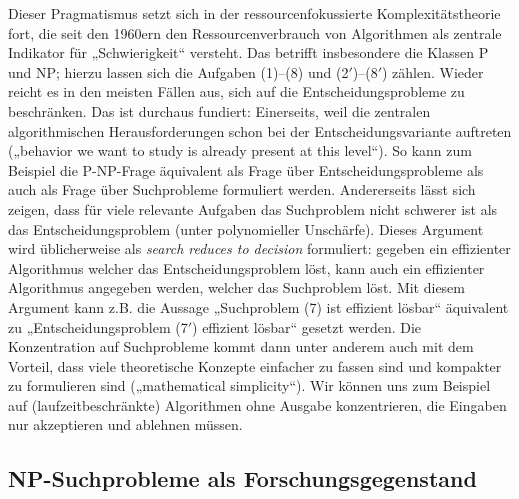 Dieser Pragmatismus setzt sich in der ressourcenfokussierte Komplexitätstheorie fort, die seit den 1960ern den Ressourcenverbrauch von Algorithmen als zentrale Indikator für „Schwierigkeit“ versteht. Das betrifft insbesondere die Klassen P und NP; hierzu lassen sich die Aufgaben (1)–(8) und (2$'$)–(8$'$) zählen.
Wieder reicht es in den meisten Fällen aus, sich auf die Entscheidungsprobleme zu beschränken.
Das ist durchaus fundiert:
Einerseits, weil die zentralen algorithmischen Herausforderungen schon bei der Entscheidungsvariante auftreten („behavior we want to study is already present at this level“). So kann zum Beispiel die P-NP-Frage äquivalent als Frage über Entscheidungsprobleme als auch als Frage über Suchprobleme formuliert werden. Andererseits lässt sich zeigen, dass für viele relevante Aufgaben das Suchproblem nicht schwerer ist als das Entscheidungsproblem (unter polynomieller Unschärfe). Dieses Argument wird üblicherweise als \emph{search reduces to decision} formuliert: gegeben ein effizienter Algorithmus welcher das Entscheidungsproblem löst, kann auch ein effizienter Algorithmus angegeben werden, welcher das Suchproblem löst. Mit diesem Argument kann z.B. die Aussage „Suchproblem (7) ist effizient lösbar“ äquivalent zu „Entscheidungsproblem (7$'$) effizient lösbar“ gesetzt werden. Die Konzentration auf Suchprobleme kommt dann unter anderem auch mit dem Vorteil, dass viele theoretische Konzepte einfacher zu fassen sind und kompakter zu formulieren sind („mathematical simplicity“). Wir können uns zum Beispiel auf (laufzeitbeschränkte) Algorithmen ohne Ausgabe konzentrieren, die Eingaben nur akzeptieren und ablehnen müssen. 

\vspace{0pt plus 2ex}
\subsection*{NP-Suchprobleme als Forschungsgegenstand}

